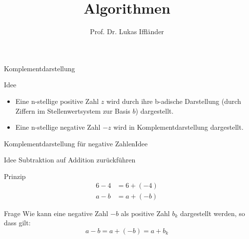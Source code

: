 \documentclass[xelatex,aspectratio=169]{beamer}
\title{Algorithmen}
\author{Prof. Dr. Lukas Iffländer}
\institute{HTW Dresden}
\date{}
\begin{document}
\begin{frame}{Komplementdarstellung}
  \begin{block}{Idee}
    \begin{itemize}
      \item Eine n-stellige positive Zahl $z$ wird durch ihre b-adische Darstellung (durch Ziffern im Stellenwertsystem zur Basis $b$) dargestellt.
      \item Eine n-stellige negative Zahl $-z$ wird in Komplementdarstellung dargestellt.
    \end{itemize}
  \end{block}

\end{frame}

\begin{frame}{Komplementdarstellung für negative Zahlen}{Idee}
  \begin{block}{Idee}
    Subtraktion auf Addition zurückführen
  \end{block}
  \begin{block}{Prinzip}
    \begin{align*}
      6 - 4 & = 6 + (-4) \\
      a - b & = a + (-b)
    \end{align*}

  \end{block}
  \begin{block}{Frage}
    Wie kann eine negative Zahl $-b$ als positive Zahl $b_k$ dargestellt werden, so dass gilt:
    \[
      a - b = a+(-b) = a + b_k
    \]
  \end{block}
\end{frame}
\end{document}
